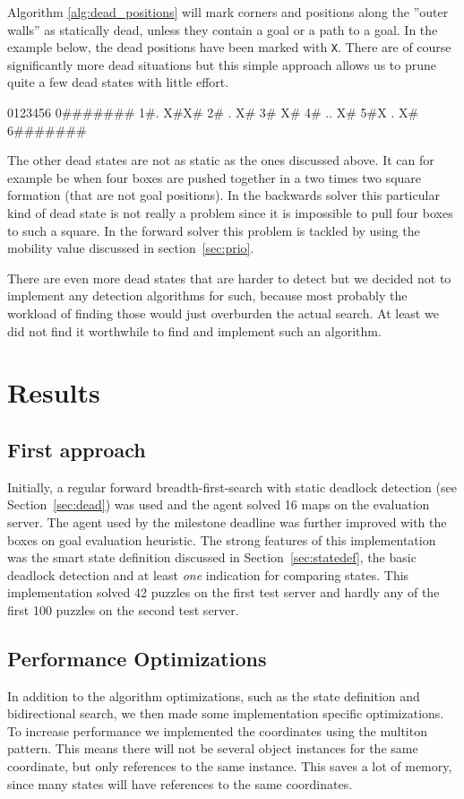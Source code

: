 \documentclass[a4paper,11pt]{article}
\begin{document}
Algorithm \ref{alg:dead_positions} will mark corners and positions along the
''outer walls'' as statically dead, unless they contain a goal or a path to a goal.
In the example below, the dead positions have been marked with \verb!X!.
There are of course significantly more dead situations but this simple approach 
allows us to prune quite a few dead states with little effort.

\begin{verbatimtab}
 0123456
0#######
1#. X#X#
2# .  X#
3#    X#
4# .. X#
5#X . X#
6#######

\end{verbatimtab}

The other dead states are not as static as the ones discussed above. 
It can for example be when four boxes are pushed together in a two times two square formation
(that are not goal positions).
In the backwards solver this particular kind of dead state is not really a problem since it is
impossible to pull four boxes to such a square.
In the forward solver this problem is tackled by using the mobility value discussed in section~\ref{sec:prio}.

There are even more dead states that are harder to detect but we decided not
to implement any detection algorithms for such, because most probably the
workload of finding those would just overburden the actual search.
At least we did not find it worthwhile to find and implement such an algorithm.

\section{Results}

\subsection{First approach}
Initially, a regular forward breadth-first-search with static deadlock detection (see Section~\ref{sec:dead})
was used and the agent solved 16 maps on the evaluation server.
The agent used by the milestone deadline was further improved with the boxes on goal evaluation heuristic.
The strong features of this implementation was the smart state definition
discussed in Section~\ref{sec:statedef}, the basic deadlock detection and at least \emph{one} indication
for comparing states.
This implementation solved 42 puzzles on the first test server and hardly any of the first 100 puzzles on the 
second test server.

\subsection{Performance Optimizations}
\label{sec:opt}
In addition to the algorithm optimizations, such as the state definition and bidirectional search,
we then made some implementation specific optimizations.
To increase performance we implemented
the coordinates using the multiton pattern.
This means there will not be several object instances for the same coordinate,
but only references to the same instance.
This saves a lot of memory, since many states will have references to the same coordinates.
\end{document}
